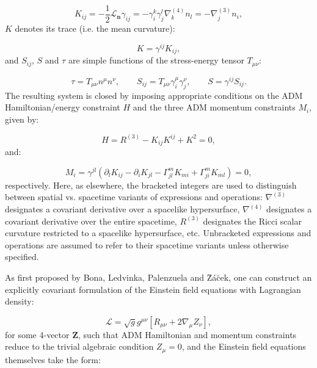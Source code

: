 \documentclass{article}
\begin{document}
\begin{equation}
K_{i j} = - \frac{1}{2} \mathcal{L}_{\mathbf{n}} \gamma_{i j} = - \gamma_{i}^{k} \gamma_{j}^{l} \nabla_{k}^{\left( 4 \right)} n_{l} = - \nabla_{j}^{\left( 3 \right)} n_{i},
\end{equation}
$K$ denotes its trace (i.e. the mean curvature):

\begin{equation}
K = \gamma^{i j} K_{i j},
\end{equation}
and ${S_{i j}}$, $S$ and ${\tau}$ are simple functions of the stress-energy tensor ${T_{\mu \nu}}$:

\begin{equation}
\tau = T_{\mu \nu} n^{\mu} n^{\nu}, \qquad S_{i j} = T_{\mu \nu} \gamma_{i}^{\mu} \gamma_{j}^{\nu}, \qquad S = \gamma^{i j} S_{i j}.
\end{equation}
The resulting system is closed by imposing appropriate conditions on the ADM Hamiltonian/energy constraint $H$ and the three ADM momentum constraints ${M_i}$, given by:

\begin{equation}
H = R^{\left( 3 \right)} - K_{i j} K^{i j} + K^2 = 0,
\end{equation}
and:

\begin{equation}
M_i = \gamma^{j l} \left( \partial_l K_{i j} - \partial_i K_{j l} - \Gamma_{j l}^{m} K_{m i} + \Gamma_{j i}^{m} K_{m l} \right) = 0,
\end{equation}
respectively. Here, as elsewhere, the bracketed integers are used to distinguish between spatial vs. spacetime variants of expressions and operations: ${\nabla^{\left( 3 \right)}}$ designates a covariant derivative over a spacelike hypersurface, ${\nabla^{\left( 4 \right)}}$ designates a covariant derivative over the entire spacetime, ${R^{\left( 3 \right)}}$ designates the Ricci scalar curvature restricted to a spacelike hypersurface, etc. Unbracketed expressions and operations are assumed to refer to their spacetime variants unless otherwise specified.

As first proposed by Bona, Ledvinka, Palenzuela and \u{Z}\'a\u{c}ek\cite{bona2}, one can construct an explicitly covariant formulation of the Einstein field equations with Lagrangian density\cite{bona3}:

\begin{equation}
\mathcal{L} = \sqrt{g} g^{\mu \nu} \left[ R_{\mu \nu} + 2 \nabla_{\mu} Z_{\nu} \right],
\end{equation}
for some 4-vector ${\mathbf{Z}}$, such that ADM Hamiltonian and momentum constraints reduce to the trivial algebraic condition ${Z_{\mu} = 0}$, and the Einstein field equations themselves take the form:
\end{document}
